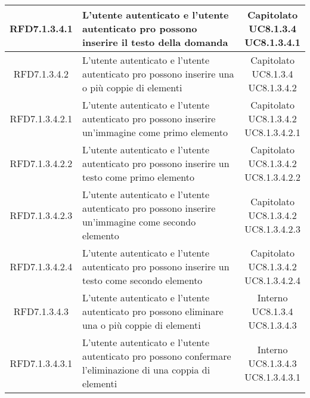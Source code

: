 \begin{longtable}{|c|>{\centering}m{7cm}|c|}
			 \hypertarget{{RFD7.1.3.4.1}}{{RFD7.1.3.4.1}} & L’utente autenticato e l'utente autenticato pro possono inserire il testo della domanda & \makecell{Capitolato\\ UC8.1.3.4 \\UC8.1.3.4.1 } \\ \hline
			 \hypertarget{{RFD7.1.3.4.2}}{{RFD7.1.3.4.2}} & L’utente autenticato e l'utente autenticato pro possono inserire una o più coppie di elementi & \makecell{Capitolato\\ UC8.1.3.4 \\UC8.1.3.4.2 } \\ \hline
			 \hypertarget{{RFD7.1.3.4.2.1}}{{RFD7.1.3.4.2.1}} & L’utente autenticato e l'utente autenticato pro possono inserire un’immagine come primo elemento & \makecell{Capitolato\\ UC8.1.3.4.2 \\UC8.1.3.4.2.1 } \\ \hline
			 \hypertarget{{RFD7.1.3.4.2.2}}{{RFD7.1.3.4.2.2}} & L’utente autenticato e l'utente autenticato pro possono inserire un testo come primo elemento & \makecell{Capitolato\\ UC8.1.3.4.2 \\UC8.1.3.4.2.2 } \\ \hline
			 \hypertarget{{RFD7.1.3.4.2.3}}{{RFD7.1.3.4.2.3}} & L’utente autenticato e l'utente autenticato pro possono inserire un’immagine come secondo elemento & \makecell{Capitolato\\ UC8.1.3.4.2 \\UC8.1.3.4.2.3 } \\ \hline
			 \hypertarget{{RFD7.1.3.4.2.4}}{{RFD7.1.3.4.2.4}} & L’utente autenticato e l'utente autenticato pro possono inserire un testo come secondo elemento & \makecell{Capitolato\\ UC8.1.3.4.2 \\UC8.1.3.4.2.4 } \\ \hline
			 \hypertarget{{RFD7.1.3.4.3}}{{RFD7.1.3.4.3}} & L’utente autenticato e l'utente autenticato pro possono eliminare una o più coppie di elementi  & \makecell{Interno\\ UC8.1.3.4 \\UC8.1.3.4.3 } \\ \hline
			 \hypertarget{{RFD7.1.3.4.3.1}}{{RFD7.1.3.4.3.1}} & L’utente autenticato e l'utente autenticato pro possono confermare l'eliminazione di una coppia di elementi & \makecell{Interno\\ UC8.1.3.4.3 \\UC8.1.3.4.3.1 } \\ \hline

\end{longtable}
